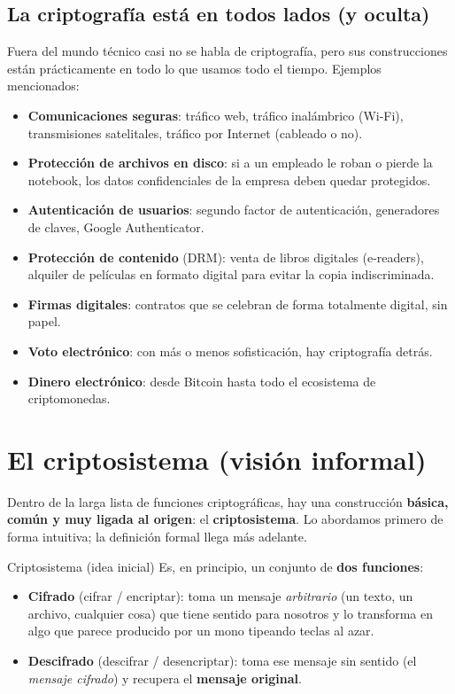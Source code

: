 \documentclass[11pt,a4paper]{article}
\begin{document}
\subsection{La criptografía está en todos lados (y oculta)}
Fuera del mundo técnico casi no se habla de criptografía, pero sus construcciones están
prácticamente en todo lo que usamos todo el tiempo. Ejemplos mencionados:
\begin{itemize}[leftmargin=1.4em,itemsep=1pt]
  \item \textbf{Comunicaciones seguras}: tráfico web, tráfico inalámbrico (Wi-Fi),
        transmisiones satelitales, tráfico por Internet (cableado o no).
  \item \textbf{Protección de archivos en disco}: si a un empleado le roban o pierde la
        notebook, los datos confidenciales de la empresa deben quedar protegidos.
  \item \textbf{Autenticación de usuarios}: segundo factor de autenticación, generadores de
        claves, Google Authenticator.
  \item \textbf{Protección de contenido} (DRM): venta de libros digitales (e-readers),
        alquiler de películas en formato digital para evitar la copia indiscriminada.
  \item \textbf{Firmas digitales}: contratos que se celebran de forma totalmente digital, sin
        papel.
  \item \textbf{Voto electrónico}: con más o menos sofisticación, hay criptografía detrás.
  \item \textbf{Dinero electrónico}: desde Bitcoin hasta todo el ecosistema de criptomonedas.
\end{itemize}

\section{El criptosistema (visión informal)}

Dentro de la larga lista de funciones criptográficas, hay una construcción \textbf{básica,
común y muy ligada al origen}: el \textbf{criptosistema}. Lo abordamos primero de forma
intuitiva; la definición formal llega más adelante.

\begin{defbox}{Criptosistema (idea inicial)}
Es, en principio, un conjunto de \textbf{dos funciones}:
\begin{itemize}[leftmargin=1.4em,itemsep=2pt]
  \item \textbf{Cifrado} (cifrar / encriptar): toma un mensaje \emph{arbitrario} (un texto,
        un archivo, cualquier cosa) que tiene sentido para nosotros y lo transforma en algo
        que parece producido por un mono tipeando teclas al azar.
  \item \textbf{Descifrado} (descifrar / desencriptar): toma ese mensaje sin sentido (el
        \emph{mensaje cifrado}) y recupera el \textbf{mensaje original}.
\end{itemize}
\end{defbox}
\end{document}
